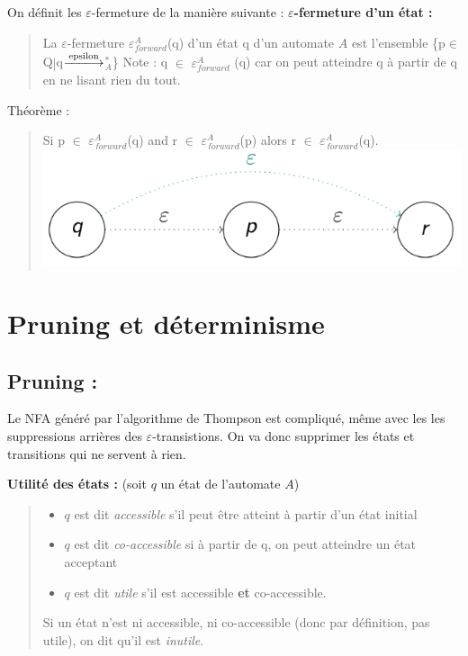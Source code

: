 \documentclass{article}
\begin{document}
On définit les $\varepsilon$-fermeture de la manière suivante :\newline\newline
\textbf{$\varepsilon$-fermeture d'un état :}
\begin{quote}
    La $\varepsilon$-fermeture $\varepsilon_{forward}^{A}$(q) d'un état q d'un automate $A$ est l'ensemble \{p$\in$Q$|$q$\xlongrightarrow{\text{epsilon}}$$_{A}^{*}$\}\newline
    Note : q $\in$ $\varepsilon_{forward}^{A}$ (q) car on peut atteindre q à partir de q en ne lisant rien du tout.
\end{quote}

Théorème :
\begin{quote}
    Si p $\in$ $\varepsilon_{forward}^{A}$(q) and r $\in$ $\varepsilon_{forward}^{A}$(p) alors r $\in$ $\varepsilon_{forward}^{A}$(q).\newline
    \includegraphics[scale=0.3]{Image11.png}
\end{quote}

\newpage
\section{Pruning et déterminisme}
\subsection{Pruning :}
Le NFA généré par l'algorithme de Thompson est compliqué, même avec les les suppressions arrières des $\varepsilon$-transistions. On va donc supprimer les états et transitions qui ne servent à rien.\newline\newline

\textbf{Utilité des états :} (soit $q$ un état de l'automate $A$)
\begin{quote}
    \begin{itemize}
        \item $q$ est dit \textit{accessible} s'il peut être atteint à partir d'un état initial
        \item $q$ est dit \textit{co-accessible} si à partir de q, on peut atteindre un état acceptant
        \item $q$ est dit \textit{utile} s'il est accessible \textbf{et} co-accessible.\newline
    \end{itemize}
    Si un état n'est ni accessible, ni co-accessible (donc par définition, pas utile), on dit qu'il est \textit{inutile}. 
\end{quote}
\end{document}
